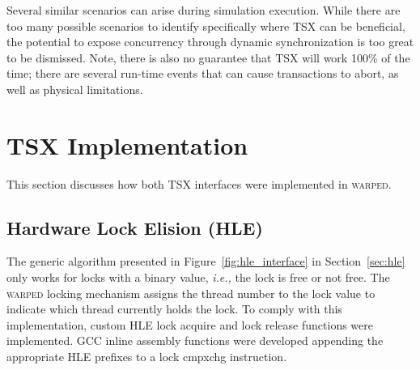 \documentclass[11pt]{book}
\begin{document}
Several similar scenarios can arise during simulation execution. While there are too many
possible scenarios to identify specifically where TSX can be beneficial, the potential to
expose concurrency through dynamic synchronization is too great to be dismissed. Note,
there is also no guarantee that TSX will work 100\% of the time; there are several
run-time events that can cause transactions to abort, as well as physical limitations.


%
%

\section{TSX Implementation}

This section discusses how both TSX interfaces were implemented in \textsc{warped}.

\subsection{Hardware Lock Elision (HLE)}

The generic algorithm presented in Figure~\ref{fig:hle_interface} in Section~\ref{sec:hle}
only works for locks with a binary value, \emph{i.e.,} the lock is free or not free.  The
\textsc{warped} locking mechanism assigns the thread number to the lock value to indicate
which thread currently holds the lock.  To comply with this implementation, custom HLE
lock acquire and lock release functions were implemented.  GCC inline assembly functions
were developed appending the appropriate HLE prefixes to a lock cmpxchg instruction.
\end{document}
